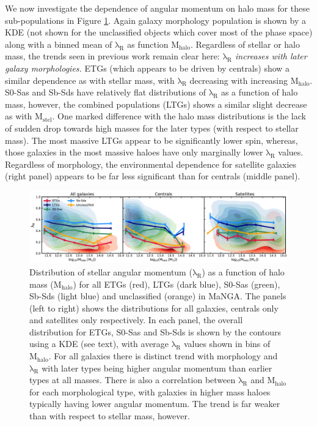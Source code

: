 We now investigate the dependence of angular momentum on halo mass for these sub-populations in Figure \ref{fig:morph_lambdaR_mhalo}. Again galaxy morphology population is shown by a KDE (not shown for the unclassified objects which cover most of the phase space) along with a binned mean of $\mathrm{\lambda_R}$ as function $\mathrm{M_{halo}}$. Regardless of stellar or halo mass, the trends seen in previous work remain clear here: \textit{$\mathrm{\lambda_R}$ increases with later galaxy morphologies.} ETGs (which appears to be driven by centrals) show a similar dependence as with stellar mass, with $\mathrm{\lambda_R}$ decreasing with increasing $\mathrm{M_{halo}}$. S0-Sas and Sb-Sds have relatively flat distributions of $\mathrm{\lambda_R}$ as a function of halo mass, however, the combined populations (LTGs) shows a similar slight decrease as with $\mathrm{M_{stel}}$. One marked difference with the halo mass distributions is the lack of sudden drop towards high masses for the later types (with respect to stellar mass). The most massive LTGs appear to be significantly lower spin, whereas, those galaxies in the most massive haloes have only marginally lower $\mathrm{\lambda_R}$ values. Regardless of morphology, the environmental dependence for satellite galaxies (right panel) appears to be far less significant than for centrals (middle panel). 

\begin{figure}
    \centering\includegraphics[width=\linewidth]{thesis/latex/cw_spin/morphology_lambdaR_mhalo_kde_wo_unclassified.pdf}
    \caption{Distribution of stellar angular momentum ($\mathrm{\lambda_R}$) as a function of halo mass ($\mathrm{M_{halo}}$) for all ETGs (red), LTGs (dark blue), S0-Sas (green), Sb-Sds (light blue) and unclassified (orange) in MaNGA. The panels (left to right) shows the distributions for all galaxies, centrals only and satellites only respectively. In each panel, the overall distribution for ETGs, S0-Sas and Sb-Sds is shown by the contours using a KDE (see text), with average $\mathrm{\lambda_R}$ values shown in bins of $\mathrm{M_{halo}}$. For all galaxies there is distinct trend with morphology and $\mathrm{\lambda_R}$  with later types being higher angular momentum than earlier types at all masses. There is also a correlation between $\mathrm{\lambda_R}$ and $\mathrm{M_{halo}}$ for each morphological type, with galaxies in higher mass haloes typically having lower angular momentum. The trend is far weaker than with respect to stellar mass, however.}
\label{fig:morph_lambdaR_mhalo}
\end{figure} 


